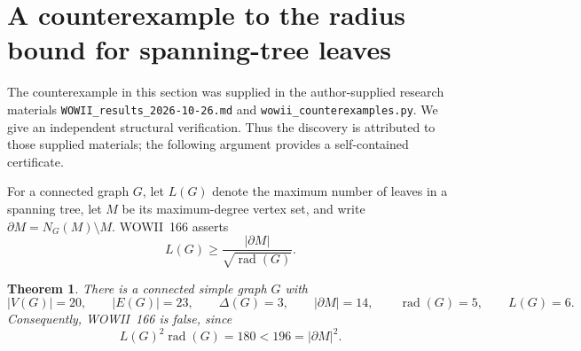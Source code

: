 \documentclass[11pt,a4paper]{article}
\newtheorem{theorem}{Theorem}[section]
\theoremstyle{remark}
\begin{document}
\section{A counterexample to the radius bound for spanning-tree leaves}
\label{r7leaf:sec166}

The counterexample in this section was supplied in the author-supplied research
materials \texttt{WOWII\_results\_2026-10-26.md} and
\texttt{wowii\_counterexamples.py}.  We give an independent structural
verification.  Thus the discovery is attributed to those supplied materials;
the following argument provides a self-contained certificate.

For a connected graph $G$, let $L(G)$ denote the maximum number of leaves in
a spanning tree, let $M$ be its maximum-degree vertex set, and write
$\partial M=N_G(M)\setminus M$.  WOWII~166 asserts
\[
 L(G)\ge \frac{|\partial M|}{\sqrt{\operatorname{rad}(G)}}.
\]

\begin{theorem}\label{r7leaf:counter166}
There is a connected simple graph $G$ with
\[
 |V(G)|=20,\qquad |E(G)|=23,\qquad
 \Delta(G)=3,\qquad |\partial M|=14,\qquad
 \operatorname{rad}(G)=5,\qquad L(G)=6.
\]
Consequently, WOWII~166 is false, since
\[
 L(G)^2\operatorname{rad}(G)=180<196=|\partial M|^2.
\]
\end{theorem}
\end{document}
